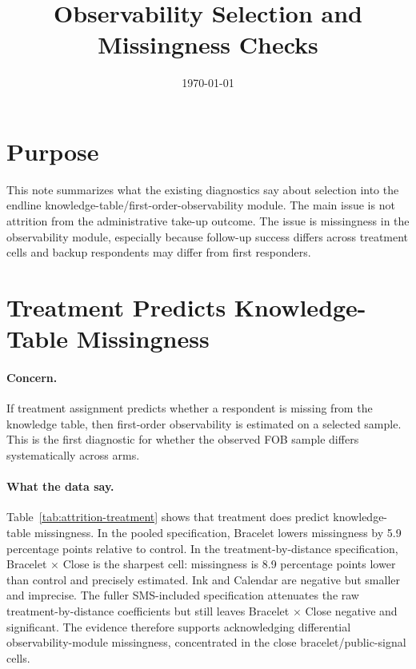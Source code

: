 \documentclass[11pt]{article}
\title{Observability Selection and Missingness Checks}
\author{}
\date{\today}
\begin{document}
\maketitle

\section*{Purpose}

This note summarizes what the existing diagnostics say about selection into the endline knowledge-table/first-order-observability module. The main issue is not attrition from the administrative take-up outcome. The issue is missingness in the observability module, especially because follow-up success differs across treatment cells and backup respondents may differ from first responders.


\section{Treatment Predicts Knowledge-Table Missingness}

\paragraph{Concern.}
If treatment assignment predicts whether a respondent is missing from the knowledge table, then first-order observability is estimated on a selected sample. This is the first diagnostic for whether the observed FOB sample differs systematically across arms.

\begin{table}[!htbp]
\centering

\end{table}
\FloatBarrier

\paragraph{What the data say.}
Table~\ref{tab:attrition-treatment} shows that treatment does predict knowledge-table missingness. In the pooled specification, Bracelet lowers missingness by 5.9 percentage points relative to control. In the treatment-by-distance specification, Bracelet $\times$ Close is the sharpest cell: missingness is 8.9 percentage points lower than control and precisely estimated. Ink and Calendar are negative but smaller and imprecise. The fuller SMS-included specification attenuates the raw treatment-by-distance coefficients but still leaves Bracelet $\times$ Close negative and significant. The evidence therefore supports acknowledging differential observability-module missingness, concentrated in the close bracelet/public-signal cells.
\end{document}
